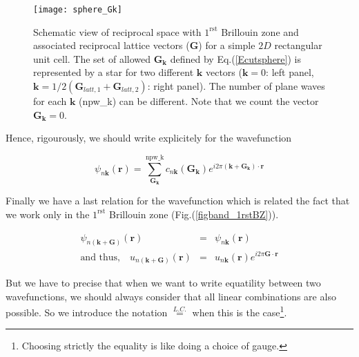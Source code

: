 \documentclass[a4paper,12pt]{report}
\begin{document}
\begin{figure}[!h]
\centering
\begin{minipage}[c]{1.0\textwidth}
\texttt{[image: sphere\_Gk]}
\end{minipage}
\vspace{0.12\textwidth}
\begin{minipage}[c]{0.9\textwidth}
\caption{\small Schematic view of reciprocal space with $1^{\text{rst}}$ Brillouin zone and associated reciprocal lattice vectors ($\mathbf{G}$) for a simple $2D$ rectangular unit cell. The set of allowed $\mathbf{G}_{\mathbf{k}}$ defined by Eq.(\ref{Ecutsphere}) is represented by a star for two different $\mathbf{k}$ vectors ($\mathbf{k}=0$: left panel, $\mathbf{k}=1/2(\mathbf{G}_{latt,1}+\mathbf{G}_{latt,2})$: right panel). The number of plane waves for each $\mathbf{k}$ (npw\_k) can be different. Note that we count the vector $\mathbf{G}_{\mathbf{k}} = 0$.}
\vspace*{1.0ex}
\label{sphere_Gk}
\end{minipage}
\end{figure}

Hence, rigourously, we should write explicitely for the wavefunction

\begin{equation}
\psi_{n\mathbf{k}}(\mathbf{r}) = \sum_{\mathbf{G_{\mathbf{k}}}}^{\text{npw\_k}} c_{n\mathbf{k}}(\mathbf{G}_{\mathbf{k}}) e^{i2\pi \left(  \mathbf{k} +\mathbf{G}_{\mathbf{k}}\right) \cdotp\mathbf{r}}
\end{equation}

Finally we have a last relation for the wavefunction which is related the fact that we work only in the $1^{\text{rst}}$ Brillouin zone (Fig.(\ref{figband_1rstBZ})).

\begin{eqnarray}
\psi_{n(\mathbf{k}+\mathbf{G})}(\mathbf{r}) &=& \psi_{n\mathbf{k}}(\mathbf{r}) \nonumber \\
\text{and thus,}\quad u_{n(\mathbf{k}+\mathbf{G})}(\mathbf{r}) &=& u_{n\mathbf{k}}(\mathbf{r}) e^{i2\pi \mathbf{G}\cdotp\mathbf{r}} \nonumber
\end{eqnarray}

But we have to precise that when we want to write equatility between two wavefunctions, we should always consider that all linear combinations are also possible. So we introduce the notation $\stackrel{L.C.}{=}$ when this is the case\footnote{Choosing strictly the equality is like doing a choice of gauge.}.
\end{document}
